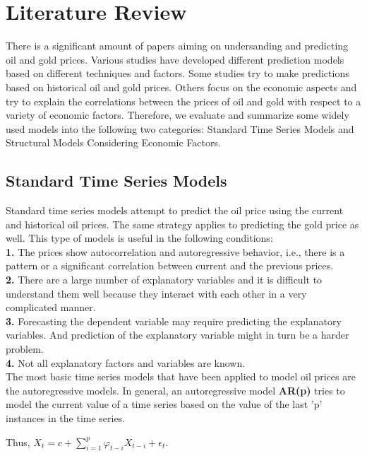 \documentclass[runningheads]{llncs}
\begin{document}
\section{Literature Review}
There is a significant amount of papers aiming on undersanding and predicting oil and gold prices. Various studies have developed different prediction models based on different techniques and factors. Some studies try to make predictions based on historical oil and gold prices. Others focus on the economic aspects and try to explain the correlations between the prices of oil and gold with respect to a variety of economic factors. Therefore, we evaluate and summarize some widely used models into the following two categories: Standard Time Series Models and Structural Models Considering Economic Factors.

\subsection{Standard Time Series Models}
Standard time series models attempt to predict the oil price using the current and historical oil prices. The same strategy applies to predicting the gold price as well. This type of models is useful in the following conditions:\\
\textbf{1.} The prices show autocorrelation and autoregressive behavior, i.e., there is a pattern or a significant correlation between current and the previous prices.\\
\textbf{2.} There are a large number of explanatory variables and it is difficult to understand them well because they interact with each other in a very complicated manner.\\
\textbf{3.} Forecasting the dependent variable may require predicting the explanatory variables. And prediction of the explanatory variable might in turn be a harder problem.\\
\textbf{4.} Not all explanatory factors and variables are known.\\ 

The most basic time series models that have been applied to model oil prices are the autoregressive models. In general, an autoregressive model \textbf{AR(p)} tries to model the current value of a time series based on the value of the last 'p' instances in the time series.

Thus, $ X_{t} = c + \sum\limits_{i=1}^p \varphi_{t-i}X_{t-i} + \epsilon_{t}$.\\\\
\end{document}
